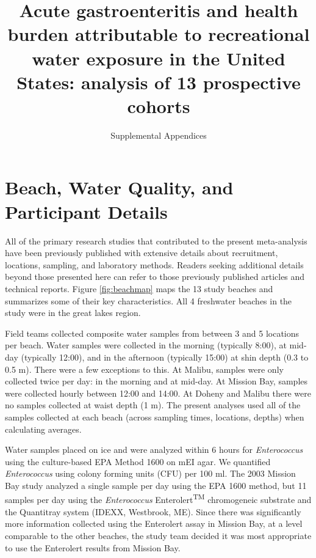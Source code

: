 \documentclass[12pt]{article}\usepackage[]{graphicx}\usepackage[]{color}
\title{Acute gastroenteritis and health burden attributable to recreational water exposure in the United States: analysis of 13 prospective cohorts}
\author{Supplemental Appendices}
\date{}
\begin{document}
\maketitle
\tableofcontents






\clearpage
\section{Beach, Water Quality, and Participant Details}

All of the primary research studies that contributed to the present meta-analysis have been previously published with extensive details about recruitment, locations, sampling, and laboratory methods. Readers seeking additional details beyond those presented here can refer to those previously published articles and technical reports.\supercite{Colford2005-nb, Colford2007-mc,Wade2006-pp,Wade2008-xj,Wade2010-bb,Wade2010-ps,Colford2012-um,Arnold2013-xd,Yau2014-pl} Figure \ref{fig:beachmap} maps the 13 study beaches and summarizes some of their key characteristics. All 4 freshwater beaches in the study were in the great lakes region. 

Field teams collected composite water samples from between 3 and 5 locations per beach. Water samples were collected in the morning (typically 8:00), at mid-day (typically 12:00), and in the afternoon (typically 15:00) at shin depth (0.3 to 0.5 m).  There were a few exceptions to this. At Malibu, samples were only collected twice per day: in the morning and at mid-day. At Mission Bay, samples were collected hourly between 12:00 and 14:00. At Doheny and Malibu there were no samples collected at waist depth (1 m).  The present analyses used all of the samples collected at each beach (across sampling times, locations, depths) when calculating averages.

Water samples placed on ice and were analyzed within 6 hours for \textit{Enterococcus} using the culture-based EPA Method 1600\supercite{Epa2009-dm} on mEI agar.  We quantified \textit{Enterococcus} using colony forming units (CFU) per 100 ml.  The 2003 Mission Bay study analyzed a single sample per day using the EPA 1600 method, but 11 samples per day using the \textit{Enterococcus} Enterolert\textsuperscript{TM} chromogeneic substrate and the Quantitray system (IDEXX, Westbrook, ME). Since there was significantly more information collected using the Enterolert assay in Mission Bay, at a level comparable to the other beaches, the study team decided it was most appropriate to use the Enterolert results from Mission Bay.
\end{document}
